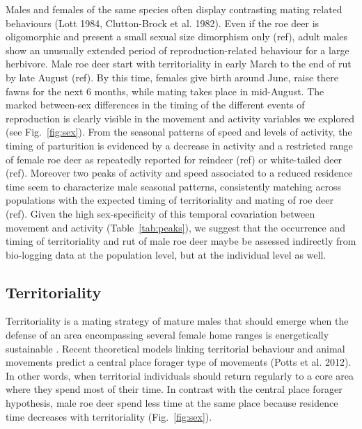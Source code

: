 \documentclass[a4paper,11pt]{article}
\begin{document}
Males and females of the same species often display contrasting mating
related behaviours (Lott 1984, Clutton-Brock et al. 1982). Even if the
roe deer is oligomorphic and present a small sexual size dimorphism
only (ref), adult males show an unusually extended period of
reproduction-related behaviour for a large herbivore. Male roe deer
start with territoriality in early March to the end of rut by late
August (ref). By this time, females give birth around June, raise
there fawns for the next 6 months, while mating takes place in
mid-August. The marked between-sex differences in the timing of the
different events of reproduction is clearly visible in the movement
and activity variables we explored (see Fig.~\ref{fig:sex}). From the
seasonal patterns of speed and levels of activity, the timing of
parturition is evidenced by a decrease in activity and a restricted
range of female roe deer as repeatedly reported for reindeer (ref) or
white-tailed deer (ref). Moreover two peaks of activity and speed
associated to a reduced residence time seem to characterize male
seasonal patterns, consistently matching across populations with the
expected timing of territoriality and mating of roe deer (ref). Given
the high sex-specificity of this temporal covariation between movement
and activity (Table~\ref{tab:peaks}), we suggest that the occurrence
and timing of territoriality and rut of male roe deer maybe be
assessed indirectly from bio-logging data at the population level, but
at the individual level as well.

\subsection*{Territoriality}

Territoriality is a mating strategy of mature males that should emerge
when the defense of an area encompassing several female home ranges is
energetically sustainable \citep{Emlen1977}. Recent theoretical models linking territorial behaviour and animal movements predict a central place forager type of movements
(Potts et al. 2012). In other words, when territorial individuals
should return regularly to a core area where they spend most of their
time. In contrast with the central place forager hypothesis, male roe
deer spend less time at the same place because residence time
decreases with territoriality (Fig.~\ref{fig:sex}).

\end{document}
